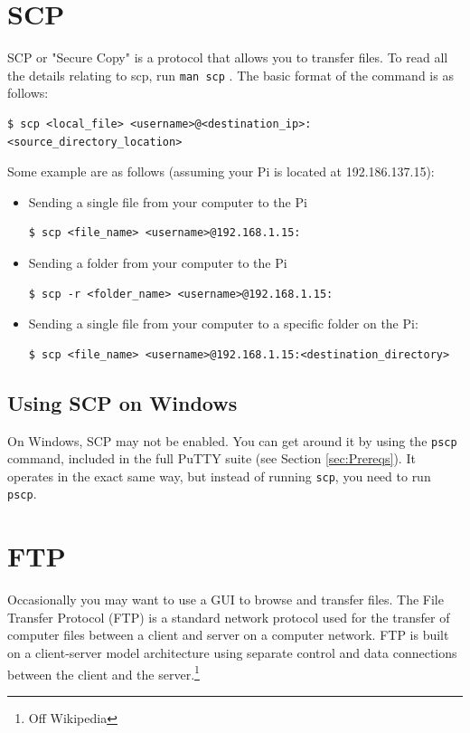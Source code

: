 \section{SCP}
\label{sec:SCP}
SCP or "Secure Copy" is a protocol that allows you to transfer files. To read all the details relating to scp, run \verb|man scp| .
The basic format of the command is as follows:
\begin{lstlisting}
$ scp <local_file> <username>@<destination_ip>:<source_directory_location>
\end{lstlisting}
Some example are as follows (assuming your Pi is located at 192.186.137.15):
\begin{itemize}
    \item Sending a single file from your computer to the Pi
    \begin{lstlisting}[gobble=4]
    $ scp <file_name> <username>@192.168.1.15:
    \end{lstlisting}
    \item Sending a folder from your computer to the Pi
    \begin{lstlisting}[gobble=4]
    $ scp -r <folder_name> <username>@192.168.1.15:
    \end{lstlisting}
    \item Sending a single file from your computer to a specific folder on the Pi:
    \begin{lstlisting}[gobble=4]
    $ scp <file_name> <username>@192.168.1.15:<destination_directory>
    \end{lstlisting}
\end{itemize}

\subsection{Using SCP on Windows}
On Windows, SCP may not be enabled. You can get around it by using the \verb|pscp| command, included in the full PuTTY suite (see Section \ref{sec:Prereqs}). It operates in the exact same way, but instead of running \verb|scp|, you need to run \verb|pscp|.

\section{FTP}
Occasionally you may want to use a GUI to browse and transfer files. The File Transfer Protocol (FTP) is a standard network protocol used for the transfer of computer files between a client and server on a computer network. FTP is built on a client-server model architecture using separate control and data connections between the client and the server.\footnote{Off Wikipedia}

